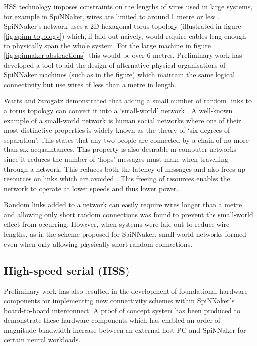 		HSS technology imposes constraints on the lengths of wires used in large
		systems, for example in SpiNNaker, wires are limited to around 1 metre or
		less \cite{sata3spec}. SpiNNaker's network uses a 2D hexagonal torus
		topology (illustrated in figure \ref{fig:spinn-topology}) which, if laid out
		naively, would require cables long enough to physically span the whole
		system. For the large machine in figure \ref{fig:spinnaker-abstractions},
		this would be over 6 metres. Preliminary work has developed a tool to aid
		the design of alternative physical organisations of SpiNNaker machines (such
		as in the figure) which maintain the same logical connectivity but use wires
		of less than a metre in length.
		
		Watts and Strogatz demonstrated that adding a small number of random links
		to a torus topology can convert it into a `small-world' network
		\cite{watts98}. A well-known example of a small-world network is human
		social networks where one of their most distinctive properties is widely
		known as the theory of `six degrees of separation'. This states that any two
		people are connected by a chain of no more than six acquaintances. This
		property is also desirable in computer networks since it reduces the number
		of `hops' messages must make when travelling through a network. This reduces
		both the latency of messages and also frees up resources on links which are
		avoided \cite{shin11}. This freeing of resources enables the network to
		operate at lower speeds and thus lower power.
		
		Random links added to a network can easily require wires longer than a metre
		and allowing only short random connections was found to prevent the
		small-world effect from occurring. However, when systems were laid out to
		reduce wire lengths, as in the scheme proposed for SpiNNaker, small-world
		networks formed even when only allowing physically short random connections.
	
	
	\subsection{High-speed serial (HSS)}
		
		Preliminary work has also resulted in the development of foundational
		hardware components for implementing new connectivity schemes within
		SpiNNaker's board-to-board interconnect. A proof of concept system has been
		produced to demonstrate these hardware components which has enabled an
		order-of-magnitude bandwidth increase between an external host PC and
		SpiNNaker for certain neural workloads.
		
